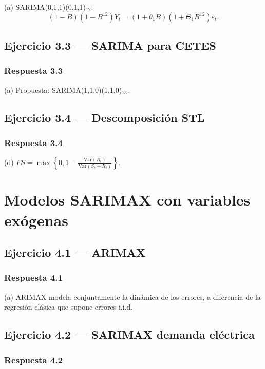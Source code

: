 \documentclass[12pt, letterpaper]{article}
\begin{document}
(a) SARIMA(0,1,1)(0,1,1)$_{12}$:
\[
(1-B)(1-B^{12})Y_t = (1+\theta_1 B)(1+\Theta_1 B^{12})\varepsilon_t.
\]

\subsection{Ejercicio 3.3 — SARIMA para CETES}

\subsubsection*{Respuesta 3.3}

(a) Propuesta: SARIMA(1,1,0)(1,1,0)$_{13}$.

\subsection{Ejercicio 3.4 — Descomposición STL}

\subsubsection*{Respuesta 3.4}

(d) $FS = \max\left\{0, 1 - \frac{\text{Var}(R_t)}{\text{Var}(S_t+R_t)}\right\}$.

\newpage
\section{Modelos SARIMAX con variables exógenas}

\subsection{Ejercicio 4.1 — ARIMAX}

\subsubsection*{Respuesta 4.1}

(a) ARIMAX modela conjuntamente la dinámica de los errores, a diferencia de la regresión clásica que supone errores i.i.d.

\subsection{Ejercicio 4.2 — SARIMAX demanda eléctrica}

\subsubsection*{Respuesta 4.2}
\end{document}
